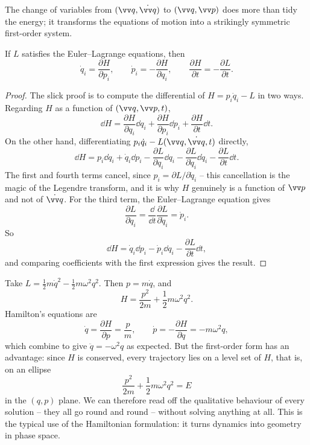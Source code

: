 The change of variables from $(\vv q, \dot{\vv q})$ to $(\vv q, \vv p)$ does more than tidy the energy; it transforms the equations of motion into a strikingly symmetric first-order system.

\begin{theorem}
	If $L$ satisfies the Euler--Lagrange equations, then
	$$
	\dot q_i = \frac{\partial H}{\partial p_i}, \qquad \dot p_i = -\frac{\partial H}{\partial q_i}, \qquad \frac{\partial H}{\partial t} = -\frac{\partial L}{\partial t}.
	$$
\end{theorem}
\begin{proof}
	The slick proof is to compute the differential of $H = p_i\dot q_i - L$ in two ways. Regarding $H$ as a function of $(\vv q, \vv p, t)$,
	$$
	\dd H = \frac{\partial H}{\partial q_i}\dd q_i + \frac{\partial H}{\partial p_i}\dd p_i + \frac{\partial H}{\partial t}\dd t.
	$$
	On the other hand, differentiating $p_i \dot q_i - L(\vv q, \dot{\vv q}, t)$ directly,
	$$
	\dd H = p_i \dd\dot q_i + \dot q_i \dd p_i - \frac{\partial L}{\partial q_i}\dd q_i - \frac{\partial L}{\partial \dot q_i}\dd \dot q_i - \frac{\partial L}{\partial t}\dd t.
	$$
	The first and fourth terms cancel, since $p_i = \partial L/\partial \dot q_i$ -- this cancellation is the magic of the Legendre transform, and it is why $H$ genuinely is a function of $\vv p$ and not of $\dot{\vv q}$. For the third term, the Euler--Lagrange equation gives
	$$
	\frac{\partial L}{\partial q_i} = \frac{\dd}{\dd t}\frac{\partial L}{\partial \dot q_i} = \dot p_i.
	$$
	So
	$$
	\dd H = \dot q_i \dd p_i - \dot p_i \dd q_i - \frac{\partial L}{\partial t}\dd t,
	$$
	and comparing coefficients with the first expression gives the result.
\end{proof}

\begin{example}
	Take $L = \frac12 m\dot q^2 - \frac12 m\omega^2 q^2$. Then $p = m\dot q$, and
	$$
	H = \frac{p^2}{2m} + \frac{1}{2}m\omega^2 q^2.
	$$
	Hamilton's equations are
	$$
	\dot q = \frac{\partial H}{\partial p} = \frac{p}{m}, \qquad \dot p = -\frac{\partial H}{\partial q} = -m\omega^2 q,
	$$
	which combine to give $\ddot q = -\omega^2 q$ as expected. But the first-order form has an advantage: since $H$ is conserved, every trajectory lies on a level set of $H$, that is, on an ellipse
	$$
	\frac{p^2}{2m} + \frac{1}{2}m\omega^2q^2 = E
	$$
	in the $(q, p)$ plane. We can therefore read off the qualitative behaviour of every solution -- they all go round and round -- without solving anything at all. This is the typical use of the Hamiltonian formulation: it turns dynamics into geometry in phase space.
\end{example}

